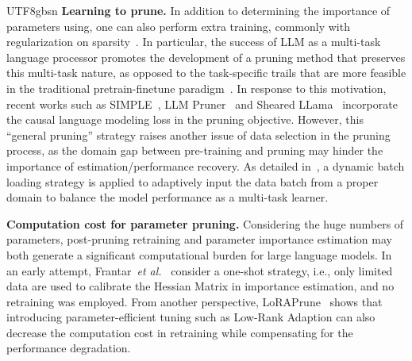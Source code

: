 \documentclass[10pt,journal,compsoc]{IEEEtran}
\newcommand{\etal}{\emph{et al.}}
\newcommand{\<}{\left\langle}
\renewcommand{\>}{\right\rangle}
\newcommand{\1}{\mathbbm{1}}
\begin{document}
\begin{CJK}{UTF8}{gbsn}
\textbf{Learning to prune.} In addition to determining the importance of parameters using, one can also perform extra training, commonly with regularization on sparsity~\cite{He2017ChannelPF,Voita2019AnalyzingMS}. In particular, the success of LLM as a multi-task language processor promotes the development of a pruning method that preserves this multi-task nature, as opposed to the task-specific trails that are more feasible in the traditional pretrain-finetune paradigm~\cite{Xia2022StructuredPL}. In response to this motivation, recent works such as SIMPLE~\cite{Tao2023StructuredPF}, LLM Pruner~\cite{Ma2023LLMPrunerOT} and Sheared LLama~\cite{Xia2023ShearedLA} incorporate the causal language modeling loss in the pruning objective. However, this “general pruning” strategy raises another issue of data selection in the pruning process, as the domain gap between pre-training and pruning may hinder the importance of estimation/performance recovery. As detailed in~\cite{Xia2023ShearedLA}, a dynamic batch loading strategy is applied to adaptively input the data batch from a proper domain to balance the model performance as a multi-task learner.

\textbf{Computation cost for parameter pruning.} Considering the huge numbers of parameters, post-pruning retraining and parameter importance estimation may both generate a significant computational burden for large language models. In an early attempt, Frantar~\etal~\cite{Frantar2023SparseGPTML} consider a one-shot strategy, i.e., only limited data are used to calibrate the Hessian Matrix in importance estimation, and no retraining was employed. From another perspective, LoRAPrune~\cite{Hu2021LoRALA} shows that introducing parameter-efficient tuning such as Low-Rank Adaption can also decrease the computation cost in retraining while compensating for the performance degradation. 


\end{CJK}
\end{document}
